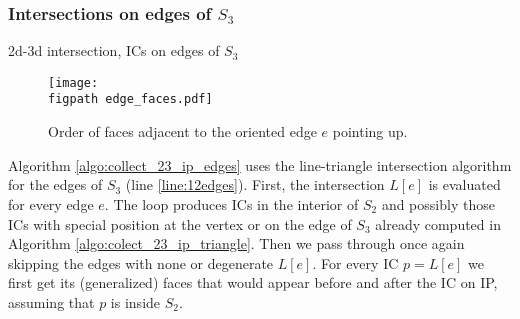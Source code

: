 \documentclass{elsarticle}
\newcommand{\figpath}{figures/}
\begin{document}
\subsubsection{Intersections on edges of $S_3$}
\label{sec:edges}
\begin{algorithm}  
  \caption{2d-3d intersection, ICs on edges of $S_3$}
  \label{algo:collect_23_ip_edges}
  
  \DontPrintSemicolon
  
    
\end{algorithm}

\begin{figure}%
  \begin{center}        
    \texttt{[image: \\figpath edge\_faces.pdf]}
  \end{center}
  \caption{Order of faces adjacent to the oriented edge $e$ pointing up.}
  \label{fig:edge_faces}
\end{figure}

Algorithm \ref{algo:collect_23_ip_edges} uses the line-triangle intersection algorithm for the edges of $S_3$ (line \ref{line:12edges}).
First, the intersection $L[e]$ is evaluated for every edge $e$. The loop produces ICs in the interior of $S_2$ and possibly those ICs with special position at the vertex or on the edge of $S_3$ already computed 
in Algorithm \ref{algo:colect_23_ip_triangle}. Then we pass through once again skipping the edges with none or degenerate $L[e]$.
For every IC $p=L[e]$ we first get its (generalized) faces that would appear before and after the IC on IP, assuming that $p$ is inside $S_2$. 
\end{document}
